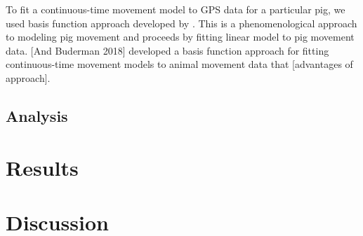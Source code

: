 \documentclass[a4paper]{article}
\begin{document}
To fit a continuous-time movement model to GPS data for a particular pig, we used basis function approach developed by \cite{Buderman2016}.  This is a phenomenological approach to modeling pig movement and proceeds by fitting linear model to pig movement data. [And Buderman 2018] developed a basis function approach for fitting continuous-time movement models to animal movement data that [advantages of approach].  




\subsection*{Analysis}



\section*{Results}
{}
\section*{Discussion}

\singlespacing





\end{document}
